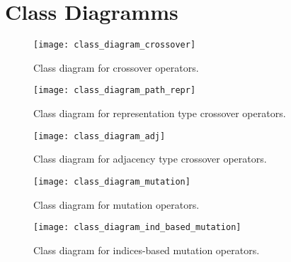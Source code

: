 \section{Class Diagramms}

\begin{figure}[t]
	\centering
	\texttt{[image: class\_diagram\_crossover]}
	\caption{Class diagram for crossover operators.}
	\label{class_diagram_crossover}
\end{figure}

\begin{figure}[t]
	\centering
	\texttt{[image: class\_diagram\_path\_repr]}
	\caption{Class diagram for representation type crossover operators.}
	\label{class_diagram_path_repr}
\end{figure}

\begin{figure}[t]
	\centering
	\texttt{[image: class\_diagram\_adj]}
	\caption{Class diagram for adjacency type crossover operators.}
	\label{class_diagram_adj}
\end{figure}

\begin{figure}[!ht]
	\centering
	\texttt{[image: class\_diagram\_mutation]}
	\caption{Class diagram for mutation operators.}
	\label{class_diagram_mutation}
\end{figure}


\begin{figure}[!ht]
	\centering
	\texttt{[image: class\_diagram\_ind\_based\_mutation]}
	\caption{Class diagram for indices-based mutation operators.}
	\label{class_diagram_ind_based_mutation}
\end{figure}

